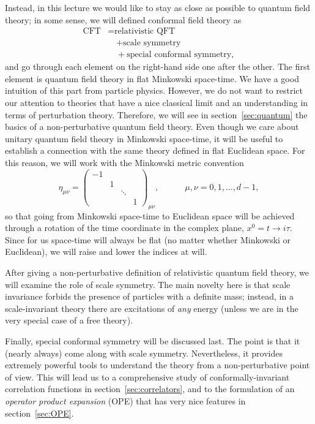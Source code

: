 \documentclass[a4paper,12pt]{article}
\numberwithin{equation}{section}
\begin{document}
Instead, in this lecture we would like to stay as close as possible to quantum field theory; in some sense, we will defined conformal field theory as
\begin{equation}
\begin{aligned}
	\text{CFT}
	&= \text{relativistic QFT} 
	\\
	& \quad
	+ \text{scale symmetry}
	\\
	& \quad
	+ \text{special conformal symmetry},
\end{aligned}
\end{equation}
and go through each element on the right-hand side one after the other.
The first element is quantum field theory in flat Minkowski space-time. We have a good intuition of this part from particle physics. However, we do not want to restrict our attention to theories that have a nice classical limit and an understanding in terms of perturbation theory.
Therefore, we will see in section~\ref{sec:quantum} the basics of a non-perturbative quantum field theory.
Even though we care about unitary quantum field theory in Minkowski space-time, it will be useful to establish a connection with the same theory defined in flat Euclidean space. For this reason, we will work with the Minkowski metric convention
\begin{equation}
	\eta_{\mu\nu} = \left( \begin{array}{cccc}
		-1 &&& \\ & 1 && \\ && \ddots & \\ &&& 1
	\end{array} \right)_{\mu\nu},
	\qquad\quad
	\mu, \nu = 0, 1, \ldots, d-1,
\end{equation}
so that going from Minkowski space-time to Euclidean space will be achieved through a rotation of the time coordinate in the complex plane, $x^0 = t \to i \tau$.
Since for us space-time will always be flat (no matter whether Minkowski or Euclidean), we will raise and lower the indices at will.

After giving a non-perturbative definition of relativistic quantum field theory, we will examine the role of scale symmetry. The main novelty here is that scale invariance forbids the presence of particles with a definite mass; instead, in a scale-invariant theory there are excitations of \emph{any} energy (unless we are in the very special case of a free theory).

Finally, special conformal symmetry will be discussed last. The point is that it (nearly always) come along with scale symmetry. Nevertheless, it provides extremely powerful tools to understand the theory from a non-perturbative point of view. This will lead us to a comprehensive study of conformally-invariant correlation functions in section~\ref{sec:correlators}, and to the formulation of an \emph{operator product expansion} (OPE) that has very nice features in section~\ref{sec:OPE}.
\end{document}
